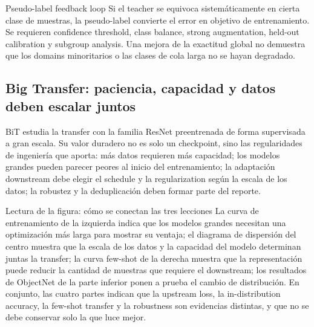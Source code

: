 
\begin{warningbox}{Pseudo-label feedback loop}
Si el teacher se equivoca sistemáticamente en cierta clase de muestras, la pseudo-label convierte el error en objetivo de entrenamiento. Se requieren confidence threshold, class balance, strong augmentation, held-out calibration y subgroup analysis. Una mejora de la exactitud global no demuestra que los domains minoritarios o las clases de cola larga no se hayan degradado.
\end{warningbox}

\subsection{Big Transfer: paciencia, capacidad y datos deben escalar juntos}

BiT estudia la transfer con la familia ResNet preentrenada de forma supervisada a gran escala. Su valor duradero no es solo un checkpoint, sino las regularidades de ingeniería que aporta: más datos requieren más capacidad; los modelos grandes pueden parecer peores al inicio del entrenamiento; la adaptación downstream debe elegir el schedule y la regularization según la escala de los datos; la robustez y la deduplicación deben formar parte del reporte.


\begin{knowledgebox}{Lectura de la figura: cómo se conectan las tres lecciones}
La curva de entrenamiento de la izquierda indica que los modelos grandes necesitan una optimización más larga para mostrar su ventaja; el diagrama de dispersión del centro muestra que la escala de los datos y la capacidad del modelo determinan juntas la transfer; la curva few-shot de la derecha muestra que la representación puede reducir la cantidad de muestras que requiere el downstream; los resultados de ObjectNet de la parte inferior ponen a prueba el cambio de distribución. En conjunto, las cuatro partes indican que la upstream loss, la in-distribution accuracy, la few-shot transfer y la robustness son evidencias distintas, y que no se debe conservar solo la que luce mejor.
\end{knowledgebox}

